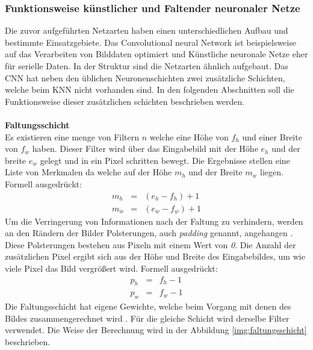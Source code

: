 \documentclass[a4paper,12pt,oneside]{article}
\begin{document}
  \subsubsection{Funktionsweise künstlicher und Faltender neuronaler Netze}\label{s.funktwknnundcnn}
Die zuvor aufgeführten Netzarten haben einen unterschiedlichen Aufbau und bestimmte Einsatzgebiete. Das Convolutional neural Network ist beispielsweise auf das Verarbeiten von Bilddaten optimiert und Künstliche neuronale Netze eher für serielle Daten. In der Struktur sind die Netzarten ähnlich aufgebaut. Das CNN hat neben den üblichen Neuronenschichten zwei zusätzliche Schichten, welche beim KNN nicht vorhanden sind. In den folgenden Abschnitten soll die Funktionsweise dieser zusätzlichen schichten beschrieben werden.\\\\
\textbf{Faltungsschicht}\\
Es existieren eine menge von Filtern $n$ welche eine Höhe von $f_{h}$ und einer Breite von $f_{w}$ haben. Dieser Filter wird über das Eingabebild mit der Höhe $e_{h}$ und der breite $e_{w}$ gelegt und in ein Pixel schritten bewegt. Die Ergebnisse stellen eine Liste von Merkmalen da welche auf der Höhe $m_{h}$ und der Breite $m_{w}$ liegen. Formell ausgedrückt:
\begin{eqnarray} 
m_{h}&=&(e_{h} - f_{h})+1\\
m_{w}&=&(e_{w} - f_{w})+1
\end{eqnarray}
Um die Verringerung von Informationen nach der Faltung zu verhindern, werden an den Rändern der Bilder Polsterungen, auch \textit{padding} genannt, angehangen \cite[343]{goodfellow2016deep}. Diese Polsterungen bestehen aus Pixeln mit einem Wert von \textit{0}. Die Anzahl der zusätzlichen Pixel ergibt sich aus der Höhe und Breite des Eingabebildes, um wie viele Pixel das Bild vergrößert wird. Formell ausgedrückt:
\begin{eqnarray}
p_{h}&=&f_{h} - 1\\
p_{w}&=&f_{w} - 1
\end{eqnarray}
Die Faltungsschicht hat eigene Gewichte, welche beim Vorgang mit denen des Bildes zusammengerechnet wird \cite[331ff.]{goodfellow2016deep}. Für die gleiche Schicht wird derselbe Filter verwendet. Die Weise der Berechnung wird in der Abbildung \ref{img:faltungsschicht}  beschrieben.\\
\end{document}
